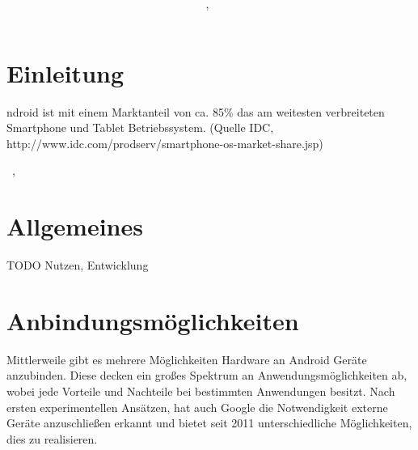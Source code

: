 \documentclass[12pt,journal,compsoc]{IEEEtran}
\begin{document}
\title{\paperTitle \\ \paperSubTitle }
\author{\paperAuthor,~}%



\maketitle

\section{Einleitung}


ndroid ist mit einem Marktanteil von ca. 85\% das am weitesten verbreiteten Smartphone und Tablet Betriebssystem.
(Quelle IDC, http://www.idc.com/prodserv/smartphone-os-market-share.jsp)



\hfill{\the\day~\Monat, \the\year  }

\section{Allgemeines}
TODO Nutzen, Entwicklung

\section{Anbindungsmöglichkeiten}
Mittlerweile gibt es mehrere Möglichkeiten Hardware an Android Geräte anzubinden. 
Diese decken ein großes Spektrum an Anwendungsmöglichkeiten ab, wobei jede Vorteile und Nachteile bei bestimmten Anwendungen besitzt.
Nach ersten experimentellen Ansätzen, hat auch Google die Notwendigkeit externe Geräte anzuschließen
erkannt und bietet seit 2011 unterschiedliche Möglichkeiten, dies zu realisieren. 
\end{document}
